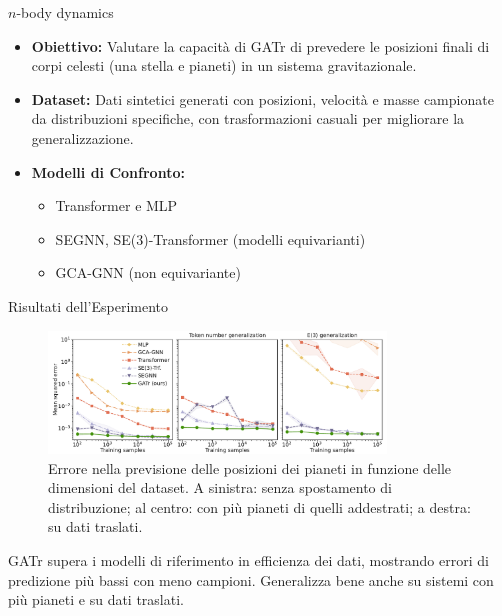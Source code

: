 \begin{frame}{\( n \)-body dynamics}
    \begin{itemize}
        \item \textbf{Obiettivo:} Valutare la capacità di GATr di prevedere le posizioni finali di 
        corpi celesti (una stella e pianeti) in un sistema gravitazionale.
        \item \textbf{Dataset:} Dati sintetici generati con posizioni, velocità e masse campionate da 
        distribuzioni specifiche, con trasformazioni casuali per migliorare la generalizzazione.
        \item \textbf{Modelli di Confronto:}
        \begin{itemize}
            \item Transformer e MLP
            \item SEGNN, SE(3)-Transformer (modelli equivarianti)
            \item GCA-GNN (non equivariante)
        \end{itemize}
    \end{itemize}
    
\end{frame}

\begin{frame}{Risultati dell'Esperimento}
    \begin{figure}
        \centering
        \includegraphics[width=0.8\textwidth]{../Images/n-body.png}
        \caption{Errore nella previsione delle posizioni dei pianeti in funzione delle 
        dimensioni del dataset. A sinistra: senza spostamento di distribuzione; al centro: 
        con più pianeti di quelli addestrati; a destra: su dati traslati.}
    \end{figure}

    GATr supera i modelli di riferimento in efficienza dei dati, mostrando errori di 
    predizione più bassi con meno campioni. Generalizza bene anche su sistemi con più 
    pianeti e su dati traslati.
\end{frame}

